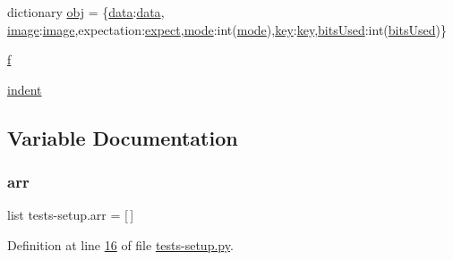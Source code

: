 \begin{DoxyCompactItemize}
dictionary \mbox{\hyperlink{namespacetests-setup_afb80c1236926b5468a6d3e942a527a96}{obj}} = \{\textquotesingle{}\mbox{\hyperlink{namespacetests-setup_a6b4da66e7d24a18856de9023a2dcede4}{data}}\textquotesingle{}\+:\mbox{\hyperlink{namespacetests-setup_a6b4da66e7d24a18856de9023a2dcede4}{data}}, \textquotesingle{}\mbox{\hyperlink{namespacetests-setup_ad55b685280f549e15688a94cbb89f512}{image}}\textquotesingle{}\+:\mbox{\hyperlink{namespacetests-setup_ad55b685280f549e15688a94cbb89f512}{image}},\textquotesingle{}expectation\textquotesingle{}\+:\mbox{\hyperlink{namespacetests-setup_a2c17344dec99b9aaaddaef4438b1f793}{expect}},\textquotesingle{}\mbox{\hyperlink{namespacetests-setup_a04126d10edec6b3171e1b55a00309b23}{mode}}\textquotesingle{}\+:int(\mbox{\hyperlink{namespacetests-setup_a04126d10edec6b3171e1b55a00309b23}{mode}}),\textquotesingle{}\mbox{\hyperlink{namespacetests-setup_a3a21e3298c630c17fc27ca5ab146a8af}{key}}\textquotesingle{}\+:\mbox{\hyperlink{namespacetests-setup_a3a21e3298c630c17fc27ca5ab146a8af}{key}},\textquotesingle{}\mbox{\hyperlink{namespacetests-setup_a64974eb034f518d24195739395783d3d}{bits\+Used}}\textquotesingle{}\+:int(\mbox{\hyperlink{namespacetests-setup_a64974eb034f518d24195739395783d3d}{bits\+Used}})\}
\item 
\mbox{\hyperlink{namespacetests-setup_a919f85fdaaec93d91baf4a46863c31fd}{f}}
\item 
\mbox{\hyperlink{namespacetests-setup_aee04695e456c1d05ed5119e87842fc86}{indent}}
\end{DoxyCompactItemize}


\subsection{Variable Documentation}
\mbox{\label{namespacetests-setup_a274aaa7c0d5733ef5f48372d9481f34a}} 
\subsubsection{\texorpdfstring{arr}{arr}}
{\footnotesize\ttfamily list tests-\/setup.\+arr = \mbox{[}$\,$\mbox{]}}



Definition at line \mbox{\hyperlink{tests-setup_8py_source_l00016}{16}} of file \mbox{\hyperlink{tests-setup_8py_source}{tests-\/setup.\+py}}.

\mbox{\label{namespacetests-setup_a64974eb034f518d24195739395783d3d}} 
